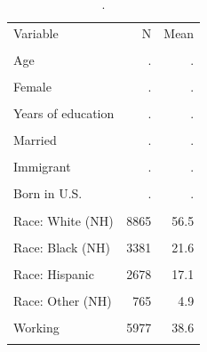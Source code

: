 \begin{table}[htbp]\centering\small
\caption{.}
\label{tab:demographics}
\begin{tabular}{lrr}\toprule
Variable & N & Mean \\\\ \midrule
Age & . & . \\\\
Female & . & . \\\\
Years of education & . & . \\\\
Married & . & . \\\\
Immigrant & . & . \\\\
Born in U.S. & . & . \\\\
Race: White (NH) & 8865 & 56.5 \\\\
Race: Black (NH) & 3381 & 21.6 \\\\
Race: Hispanic & 2678 & 17.1 \\\\
Race: Other (NH) & 765 & 4.9 \\\\
Working & 5977 & 38.6 \\\\
\bottomrule
\end{tabular}\end{table}
